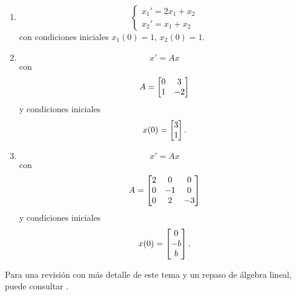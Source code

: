 \begin{enumerate}
 \item
 $$
\begin{cases}
 x_{1}'=2x_{1}+x_{2} \\
 x_{2}'=x_{1} + x_{2}
\end{cases}
 $$
con condiciones iniciales $x_{1}(0)=1, \, x_{2}(0)=1.$

\item
$$x'=Ax$$ con
$$
A=\begin{bmatrix}0 & 3 \\ 1 & -2\end{bmatrix}
$$
y condiciones iniciales
$$
x(0)=\begin{bmatrix}3 \\ 1\end{bmatrix}.
$$

\item
$$
x'=Ax
$$
con
$$
A=\begin{bmatrix}2&0&0\\0&-1&0\\0&2&-3\end{bmatrix}
$$
y condiciones iniciales
$$
x(0)=\begin{bmatrix}0\\-b\\b\end{bmatrix}.
$$
\end{enumerate}

Para una revisión con más detalle de este tema y un repaso de álgebra lineal, puede consultar \cite[capítulo 3]{HS}.
